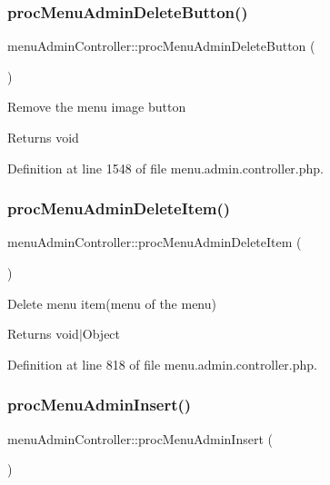 \subsubsection{\texorpdfstring{proc\+Menu\+Admin\+Delete\+Button()}{procMenuAdminDeleteButton()}}
{\footnotesize\ttfamily menu\+Admin\+Controller\+::proc\+Menu\+Admin\+Delete\+Button (\begin{DoxyParamCaption}{ }\end{DoxyParamCaption})}

Remove the menu image button \begin{DoxyReturn}{Returns}
void 
\end{DoxyReturn}


Definition at line 1548 of file menu.\+admin.\+controller.\+php.

\mbox{\label{classmenuAdminController_a95f3b583f04dcd805696f7fd33b13d9c}} 
\subsubsection{\texorpdfstring{proc\+Menu\+Admin\+Delete\+Item()}{procMenuAdminDeleteItem()}}
{\footnotesize\ttfamily menu\+Admin\+Controller\+::proc\+Menu\+Admin\+Delete\+Item (\begin{DoxyParamCaption}{ }\end{DoxyParamCaption})}

Delete menu item(menu of the menu) \begin{DoxyReturn}{Returns}
void$\vert$\+Object 
\end{DoxyReturn}


Definition at line 818 of file menu.\+admin.\+controller.\+php.

\mbox{\label{classmenuAdminController_a3c022826d1ffe76b9d5557d3f126ff97}} 
\subsubsection{\texorpdfstring{proc\+Menu\+Admin\+Insert()}{procMenuAdminInsert()}}
{\footnotesize\ttfamily menu\+Admin\+Controller\+::proc\+Menu\+Admin\+Insert (\begin{DoxyParamCaption}{ }\end{DoxyParamCaption})}

